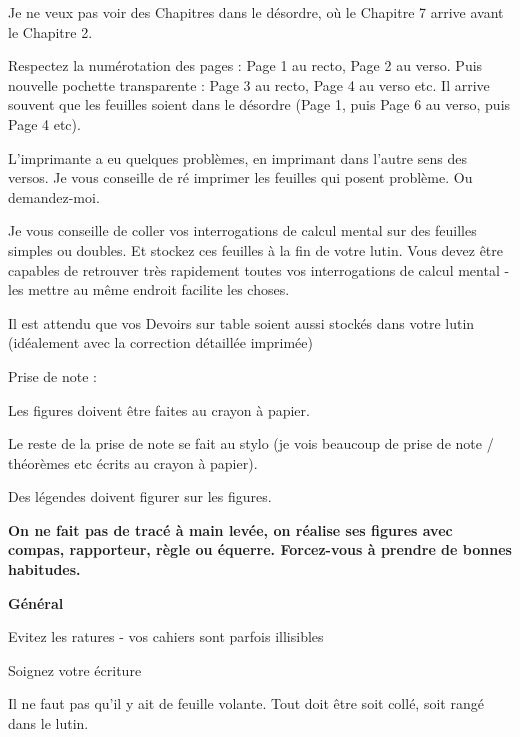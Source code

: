 \documentclass[answers]{exam}
\begin{document}
\begin{compactitem}
  \item Je ne veux pas voir des Chapitres dans le désordre, où le Chapitre 7 arrive avant le Chapitre 2.
  \item Respectez la numérotation des pages : Page 1 au recto, Page 2 au verso. Puis nouvelle pochette transparente : Page 3 au recto, Page 4 au verso etc. Il arrive souvent que les feuilles soient dans le désordre (Page 1, puis Page 6 au verso, puis Page 4 etc).
  \item L'imprimante a eu quelques problèmes, en imprimant dans l'autre sens des versos. Je vous conseille de ré imprimer les feuilles qui posent problème. Ou demandez-moi. 
  \item Je vous conseille de coller vos interrogations de calcul mental sur des feuilles simples ou doubles. Et stockez ces feuilles à la fin de votre lutin. Vous devez être capables de retrouver très rapidement toutes vos interrogations de calcul mental - les mettre au même endroit facilite les choses.
  \item Il est attendu que vos Devoirs sur table soient aussi stockés dans votre lutin (idéalement avec la correction détaillée imprimée) 
  \item Prise de note : 
  \begin{compactitem}
    \item Les figures doivent être faites au crayon à papier.
    \item Le reste de la prise de note se fait au stylo (je vois beaucoup de prise de note / théorèmes etc écrits au crayon à papier).
    \item Des légendes doivent figurer sur les figures.
    \item \textbf{On ne fait pas de tracé à main levée, on réalise ses figures avec compas, rapporteur, règle ou équerre. Forcez-vous à prendre de bonnes habitudes.}
  \end{compactitem}
\end{compactitem}

\vspace{1em}
\noindent\textbf{Général}\par\vspace{0.5\baselineskip}

\begin{compactitem}
  \item Evitez les ratures - vos cahiers sont parfois illisibles
  \item Soignez votre écriture
  \item Il ne faut pas qu'il y ait de feuille volante. Tout doit être soit collé, soit rangé dans le lutin. 
\end{compactitem}
\end{document}
